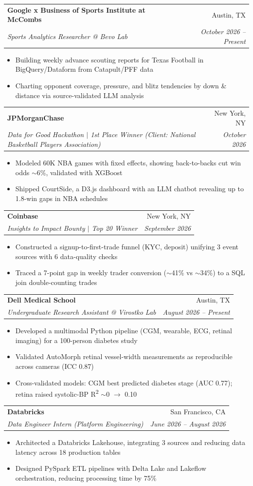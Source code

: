\documentclass[letterpaper,11pt]{article}
\makeatletter
\newcommand{\resumeItem}[1]{
  \item\small{
    {#1 \vspace{-2pt}}
  }
}
\newcommand{\resumeJobAt}[4]{
  \vspace{-3pt}\item
    \begin{tabular*}{0.97\textwidth}[t]{l@{\extracolsep{\fill}}r}
      \textbf{#1} & #2 \\[-3pt]
      \textit{\small#3} & \textit{\small #4} \\
    \end{tabular*}\vspace{-7pt}
}
\newcommand{\resumeItemListStart}{\begin{itemize}[itemsep=0pt, topsep=2pt]}
\newcommand{\resumeItemListEnd}{\end{itemize}\vspace{-5pt}}
\makeatother
\begin{document}
    \resumeJobAt
      {Google x Business of Sports Institute at McCombs}{Austin, TX}
      {Sports Analytics Researcher @ Bevo Lab}{October 2026 -- Present}
      \resumeItemListStart
        \resumeItem{Building weekly advance scouting reports for Texas Football in BigQuery/Dataform from Catapult/PFF data}
        \resumeItem{Charting opponent coverage, pressure, and blitz tendencies by down \& distance via source-validated LLM analysis}
      \resumeItemListEnd

    \resumeJobAt
      {JPMorganChase}{New York, NY}
      {Data for Good Hackathon $|$ 1st Place Winner (Client: National Basketball Players Association)}{October 2026}
      \resumeItemListStart
        \resumeItem{Modeled 60K NBA games with fixed effects, showing back-to-backs cut win odds $\sim$6\%, validated with XGBoost}
        \resumeItem{Shipped CourtSide, a D3.js dashboard with an LLM chatbot revealing up to 1.8-win gaps in NBA schedules}
      \resumeItemListEnd

    \resumeJobAt
      {Coinbase}{New York, NY}
      {Insights to Impact Bounty $|$ Top 20 Winner}{September 2026}
      \resumeItemListStart
        \resumeItem{Constructed a signup-to-first-trade funnel (KYC, deposit) unifying 3 event sources with 6 data-quality checks}
        \resumeItem{Traced a 7-point gap in weekly trader conversion ($\sim$41\% vs $\sim$34\%) to a SQL join double-counting trades}
      \resumeItemListEnd

    \resumeJobAt
      {Dell Medical School}{Austin, TX}
      {Undergraduate Research Assistant @ Virostko Lab}{August 2026 -- Present}
      \resumeItemListStart
        \resumeItem{Developed a multimodal Python pipeline (CGM, wearable, ECG, retinal imaging) for a 100-person diabetes study}
        \resumeItem{Validated AutoMorph retinal vessel-width measurements as reproducible across cameras (ICC 0.87)}
        \resumeItem{Cross-validated models: CGM best predicted diabetes stage (AUC 0.77); retina raised systolic-BP R\textsuperscript{2} $\sim$0 $\rightarrow$ 0.10}
      \resumeItemListEnd

    \resumeJobAt
      {Databricks}{San Francisco, CA}
      {Data Engineer Intern (Platform Engineering)}{June 2026 -- August 2026}
      \resumeItemListStart
        \resumeItem{Architected a Databricks Lakehouse, integrating 3 sources and reducing data latency across 18 production tables}
        \resumeItem{Designed PySpark ETL pipelines with Delta Lake and Lakeflow orchestration, reducing processing time by 75\%}
      \resumeItemListEnd
\end{document}
